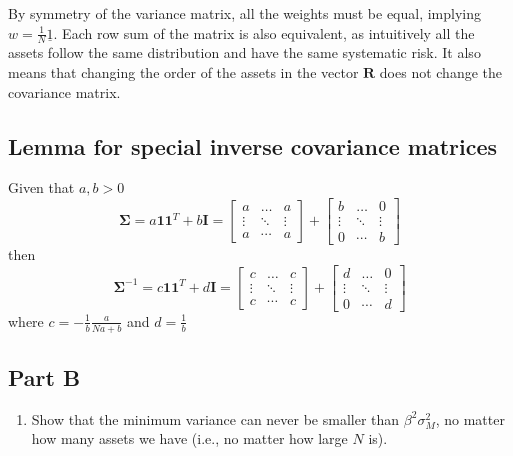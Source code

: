 \documentclass[
  oneside]{book}
\providecommand{\tightlist}{%
  \setlength{\itemsep}{0pt}\setlength{\parskip}{0pt}}
\begin{document}
By symmetry of the variance matrix, all the weights must be equal, implying \(w = \frac{1}{N} \underline{1}\). Each row sum of the matrix is also equivalent, as intuitively all the assets follow the same distribution and have the same systematic risk. It also means that changing the order of the assets in the vector \(\mathbf{R}\) does not change the covariance matrix.

\hypertarget{lemma-for-special-inverse-covariance-matrices}{%
\subsection{Lemma for special inverse covariance matrices}\label{lemma-for-special-inverse-covariance-matrices}}

Given that \(a,b > 0\)
\[
\boldsymbol{\Sigma}=a \mathbf{1 1}^T+b \boldsymbol{I}=\left[\begin{array}{ccc}
a & \ldots & a \\
\vdots & \ddots & \vdots \\
a & \cdots & a
\end{array}\right]+\left[\begin{array}{ccc}
b & \ldots & 0 \\
\vdots & \ddots & \vdots \\
0 & \cdots & b
\end{array}\right]
\]
then
\[
\boldsymbol{\Sigma}^{-1}=c \mathbf{1 1}^T+d \boldsymbol{I}=\left[\begin{array}{ccc}
c & \ldots & c \\
\vdots & \ddots & \vdots \\
c & \cdots & c
\end{array}\right]+\left[\begin{array}{ccc}
d & \ldots & 0 \\
\vdots & \ddots & \vdots \\
0 & \cdots & d
\end{array}\right]
\]
where \(c = -\frac{1}{b} \frac{a}{Na+b}\) and \(d = \frac{1}{b}\)

\hypertarget{part-b-8}{%
\subsection{Part B}\label{part-b-8}}

\begin{enumerate}
\def\labelenumi{(\alph{enumi})}
\setcounter{enumi}{1}
\tightlist
\item
  Show that the minimum variance can never be smaller than \(\beta^2 \sigma_M^2\), no matter how many assets we have (i.e., no matter how large \(N\) is).
\end{enumerate}
\end{document}
